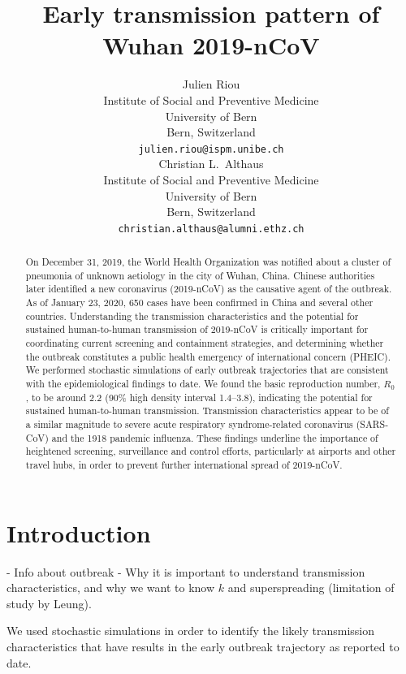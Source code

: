 \documentclass{article}
\title{Early transmission pattern of Wuhan 2019-nCoV}
\author{
   Julien Riou \\
  Institute of Social and Preventive Medicine\\
  University of Bern\\
  Bern, Switzerland \\
  \texttt{julien.riou@ispm.unibe.ch} \\
  \And
Christian L.~Althaus \\
Institute of Social and Preventive Medicine\\
University of Bern\\
Bern, Switzerland \\
\texttt{christian.althaus@alumni.ethz.ch}
}
\begin{document}
\maketitle

\begin{abstract}
On December 31, 2019, the World Health Organization was notified about a cluster of pneumonia of unknown aetiology in the city of Wuhan, China. Chinese authorities later identified a new coronavirus (2019-nCoV) as the causative agent of the outbreak. As of January 23, 2020, 650 cases have been confirmed in China and several other countries. Understanding the transmission characteristics and the potential for sustained human-to-human transmission of 2019-nCoV is critically important for coordinating current screening and containment strategies, and determining whether the outbreak constitutes a public health emergency of international concern (PHEIC). We performed stochastic simulations of early outbreak trajectories that are consistent with the epidemiological findings to date. We found the basic reproduction number, $R_0$, to be around 2.2 (90\% high density interval 1.4--3.8), indicating the potential for sustained human-to-human transmission. Transmission characteristics appear to be of a similar magnitude to severe acute respiratory syndrome-related coronavirus (SARS-CoV) and the 1918 pandemic influenza. These findings underline the importance of heightened screening, surveillance and control efforts, particularly at airports and other travel hubs, in order to prevent further international spread of 2019-nCoV.
\end{abstract}

\section{Introduction}

\citet{Shi:2020}

- Info about outbreak
- Why it is important to understand transmission characteristics, and why we want to know $k$ and superspreading (limitation of study by Leung).

We used stochastic simulations in order to identify the likely transmission characteristics that have results in the early outbreak trajectory as reported to date.
\end{document}
